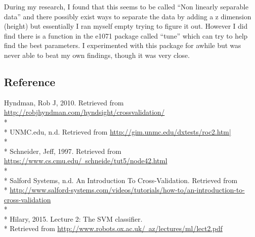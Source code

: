 \documentclass[10pt]{article}
\begin{document}
During my research, I found that this seems to be called “Non linearly separable data” and there possibly exist ways to separate the data by adding a z dimension (height) but essentially I ran myself empty trying to figure it out. However I did find there is a function in the e1071 package called “tune” which can try to help find the best parameters. I experimented with this package for awhile but was never able to beat my own findings, though it was very close. 

\subsection*{Reference}
Hyndman, Rob J, 2010. Retrieved from \href{url}{http://robjhyndman.com/hyndsight/crossvalidation/}\\*\\*
UNMC.edu, n.d. Retrieved from \href{url}{http://gim.unmc.edu/dxtests/roc2.htm|}\\*\\*
Schneider, Jeff, 1997. Retrieved from \href{url}{https://www.cs.cmu.edu/~schneide/tut5/node42.html}\\*\\*
Salford Systems, n.d. An Introduction To Cross-Validation. Retrieved from\\*
\href{url}{http://www.salford-systems.com/videos/tutorials/how-to/an-introduction-to-cross-validation}\\*\\*
Hilary, 2015. Lecture 2: The SVM classifier.\\*
Retrieved from \href{url}{http://www.robots.ox.ac.uk/~az/lectures/ml/lect2.pdf}
\end{document}
